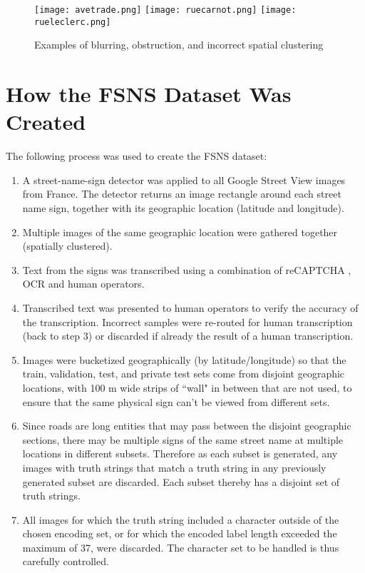 \documentclass[runningheads]{llncs}
\begin{document}
\begin{figure}
\centering
\texttt{[image: avetrade.png]}
\texttt{[image: ruecarnot.png]}
\texttt{[image: rueleclerc.png]}
\caption{Examples of blurring, obstruction, and incorrect spatial clustering}
\label{fig:blurring}
\end{figure}

\section{How the FSNS Dataset Was Created}
\label{sec:created}

The following process was used to create the FSNS dataset:
\begin{enumerate}
  \item A street-name-sign detector was applied to all Google Street View images from France. The detector returns an image rectangle around each street name sign, together with its geographic location (latitude and longitude).
  \item Multiple images of the same geographic location were gathered together (spatially clustered).
  \item Text from the signs was transcribed using a combination of reCAPTCHA \cite{recaptcha}, OCR and human operators.
  \item Transcribed text was presented to human operators to verify the accuracy of the transcription. Incorrect samples were re-routed for human transcription (back to step 3) or discarded if already the result of a human transcription.
  \item Images were bucketized geographically (by latitude/longitude) so that the train, validation, test,
 and private test sets come from disjoint geographic locations, with 100 m wide strips of ``wall" in
 between that are not used, to ensure that the same physical sign can't be viewed from different sets.
  \item Since roads are long entities that may pass between the disjoint geographic sections, there may be multiple signs of the same street name at multiple locations in different subsets. Therefore as each subset is generated, any images with truth strings that match a truth string in any previously generated subset are discarded. Each subset thereby has a disjoint set of truth strings.
  \item All images for which the truth string included a character outside of the chosen encoding set, or for which the encoded label length exceeded the maximum of 37, were discarded. The character set to be handled is thus carefully controlled.
\end{enumerate}
\end{document}
